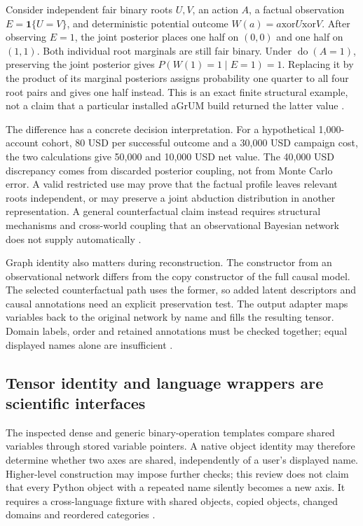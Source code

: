 Consider independent fair binary roots $U,V$, an action $A$, a factual
observation $E=\mathbf1\{U=V\}$, and deterministic potential outcome
$W(a)=a\mathbin{\mathrm{xor}}U\mathbin{\mathrm{xor}}V$.
After observing $E=1$, the joint posterior places one half on $(0,0)$ and
one half on $(1,1)$. Both individual root marginals are still fair binary.
Under $\operatorname{do}(A=1)$, preserving the joint posterior gives
$P(W(1)=1\mid E=1)=1$. Replacing it by the product of its marginal
posteriors assigns probability one quarter to all four root pairs and gives
one half instead. This is an exact finite structural example, not a claim
that a particular installed aGrUM build returned the latter value
\cite{exec24_agrum_choice}.

The difference has a concrete decision interpretation. For a hypothetical
1,000-account cohort, 80 USD per successful outcome and a 30,000 USD
campaign cost, the two calculations give 50,000 and 10,000 USD net value.
The 40,000 USD discrepancy comes from discarded posterior coupling, not
from Monte Carlo error. A valid restricted use may prove that the factual
profile leaves relevant roots independent, or may preserve a joint
abduction distribution in another representation. A general counterfactual
claim instead requires structural mechanisms and cross-world coupling that
an observational Bayesian network does not supply automatically
\cite{exec24_agrum_choice}.

Graph identity also matters during reconstruction. The constructor from an
observational network differs from the copy constructor of the full causal
model. The selected counterfactual path uses the former, so added latent
descriptors and causal annotations need an explicit preservation test.
The output adapter maps variables back to the original network by name and
fills the resulting tensor. Domain labels, order and retained annotations
must be checked together; equal displayed names alone are insufficient
\cite{exec24_agrum_source}.

\subsection{Tensor identity and language wrappers are scientific interfaces}
The inspected dense and generic binary-operation templates compare shared
variables through stored variable pointers. A native object identity may
therefore determine whether two axes are shared, independently of a user's
displayed name. Higher-level construction may impose further checks; this
review does not claim that every Python object with a repeated name silently
becomes a new axis. It requires a cross-language fixture with shared objects,
copied objects, changed domains and reordered categories
\cite{exec24_agrum_source}.

